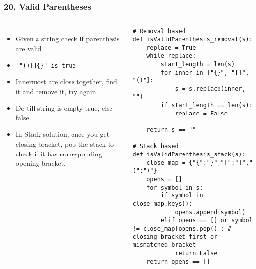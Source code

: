 \begin{frame}[fragile]\frametitle{20. Valid Parentheses}

	\begin{columns}[T]
	\begin{itemize}
	\item Given a string check if parenthesis are valid
	\item \lstinline| "()[]{}" is true|
	\item Innermost are close together, find it and remove it, try again.
	\item Do till string is empty  true, else false.
	\item In Stack solution, once you get closing bracket, pop the stack to check if it has corresponding opening bracket.
	\end{itemize}
		\begin{lstlisting}[basicstyle=\scriptsize]
# Removal based
def isValidParenthesis_removal(s):		
    replace = True
    while replace:
        start_length = len(s)
        for inner in ["{}", "[]", "()"]:
            s = s.replace(inner, "")
        if start_length == len(s):
            replace = False

    return s == ""
		
# Stack based
def isValidParenthesis_stack(s):
    close_map = {"{":"}","[":"]","(":")"}
    opens = []
    for symbol in s:
        if symbol in close_map.keys():
            opens.append(symbol)
        elif opens == [] or symbol != close_map[opens.pop()]: # closing bracket first or mismatched bracket
            return False
    return opens == []		
				\end{lstlisting}		

	\end{columns}
		
\end{frame}

